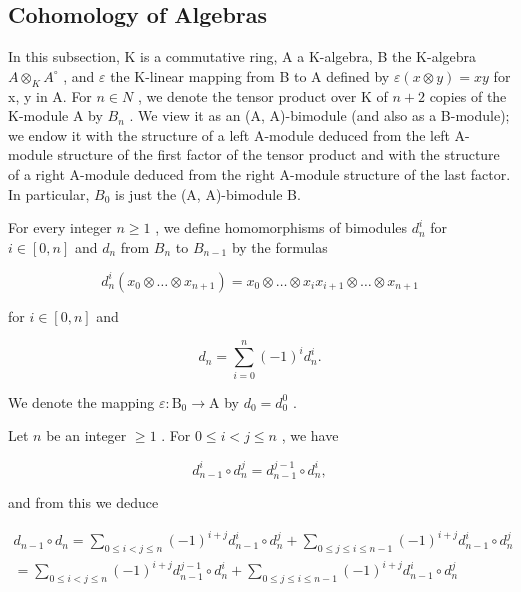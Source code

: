 \subsection{Cohomology of Algebras}

In this subsection, K is a commutative ring, A a K-algebra, B the K-algebra \(A \otimes_{K} A^{\circ}\) , and \(\varepsilon\) the K-linear mapping from B to A defined by \(\varepsilon(x \otimes y) = xy\) for x, y in A. For \(n \in N\) , we denote the tensor product over K of \(n + 2\) copies of the K-module A by \(B_{n}\) . We view it as an (A, A)-bimodule (and also as a B-module); we endow it with the structure of a left A-module deduced from the left A-module structure of the first factor of the tensor product and with the structure of a right A-module deduced from the right A-module structure of the last factor. In particular, \(B_{0}\) is just the (A, A)-bimodule B.

For every integer \(n \geqslant 1\) , we define homomorphisms of bimodules \(d_{n}^{i}\) for \(i \in [0, n]\) and \(d_{n}\) from \(B_{n}\) to \(B_{n-1}\) by the formulas

\[
d _ {n} ^ {i} (x _ {0} \otimes \dots \otimes x _ {n + 1}) = x _ {0} \otimes \dots \otimes x _ {i} x _ {i + 1} \otimes \dots \otimes x _ {n + 1}\tag{4}
\]

for \(i\in [0,n]\) and

\[
d _ {n} = \sum_ {i = 0} ^ {n} (- 1) ^ {i} d _ {n} ^ {i}.\tag{5}
\]

We denote the mapping \(\varepsilon : \mathrm{B}_0 \to \mathrm{A}\) by \(d_0 = d_0^0\) .

Let \(n\) be an integer \(\geqslant 1\) . For \(0 \leqslant i < j \leqslant n\) , we have

\[
d _ {n - 1} ^ {i} \circ d _ {n} ^ {j} = d _ {n - 1} ^ {j - 1} \circ d _ {n} ^ {i},\tag{6}
\]

and from this we deduce

\[
\begin{array}{c} d _ {n - 1} \circ d _ {n} = \sum_ {0 \leqslant i <   j \leqslant n} (- 1) ^ {i + j} d _ {n - 1} ^ {i} \circ d _ {n} ^ {j} + \sum_ {0 \leqslant j \leqslant i \leqslant n - 1} (- 1) ^ {i + j} d _ {n - 1} ^ {i} \circ d _ {n} ^ {j} \\ = \sum_ {0 \leqslant i <   j \leqslant n} (- 1) ^ {i + j} d _ {n - 1} ^ {j - 1} \circ d _ {n} ^ {i} + \sum_ {0 \leqslant j \leqslant i \leqslant n - 1} (- 1) ^ {i + j} d _ {n - 1} ^ {i} \circ d _ {n} ^ {j} \end{array}
\]

